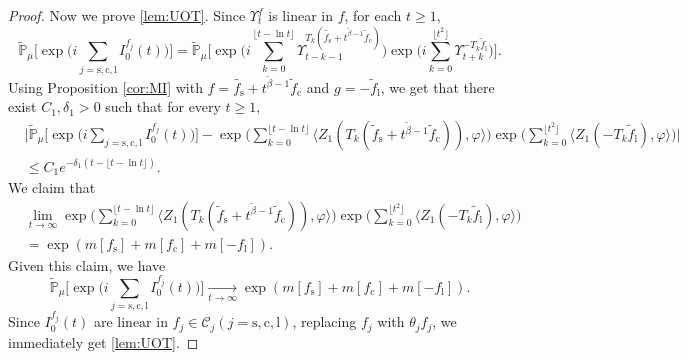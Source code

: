 \documentclass[12pt,a4paper]{amsart}
\theoremstyle{plain}
\theoremstyle{definition}
\numberwithin{equation}{section}
\begin{document}
\begin{proof}
Now we prove \eqref{lem:UOT}.
Since $\Upsilon_t^f$ is linear in $f$, for each $t\geq 1$,
\[
\widetilde{\mathbb P}_{\mu}\Big[\exp\Big(i
\sum_{j=\mathrm s,\mathrm c,\mathrm l}I_0^{f_j}(t)\Big)\Big]
= \widetilde{\mathbb P}_{\mu}\Big[\exp\Big(i\sum_{k=0}^{\lfloor t-\ln t \rfloor}\Upsilon_{t-k-1}^{T_k(\tilde{f_\mathrm s}+t^{\tilde{\beta}-1} \tilde{f}_{\mathrm c})}\Big)\exp\Big(i\sum_{k=0}^{\lfloor t^2 \rfloor}\Upsilon_{t+k}^{-T_k\tilde{f}_{\mathrm l}}\Big)\Big].
\]
Using Proposition \ref{cor:MI} 
with $f=\tilde{f_\mathrm s}+t^{\tilde{\beta}-1} \tilde{f}_{\mathrm c}$ and $g = -\tilde{f}_{\mathrm l}$, we get that there exist $C_1,\delta_1 > 0$ such that
for every $t\geq 1$,
  \begin{align}
    &\Big|\widetilde{\mathbb P}_{\mu}\Big[\exp\Big(i \sum_{j=\mathrm s,\mathrm c,\mathrm l}I_0^{f_j}(t)\Big)\Big]
    -\exp\Big(\sum_{k=0}^{\lfloor t-\ln t \rfloor} \langle Z_1(T_{k}(\tilde f_\mathrm s+t^{\tilde{\beta}-1}\tilde{f}_{\mathrm c})), \varphi\rangle \Big)\exp\Big(\sum_{k=0}^{\lfloor t^2 \rfloor}\langle Z_1(-T_k\tilde{f}_{\mathrm l}),\varphi\rangle\Big)\Big|\\
    &\leq C_1 e^{-\delta_1(t - \lfloor t - \ln t\rfloor)}.
  \end{align}
We claim that
\begin{align} \label{eq:UOT.1}
&\lim_{t\rightarrow\infty}\exp\Big(\sum_{k=0}^{\lfloor t-\ln t \rfloor} \langle Z_1(T_{k}(\tilde f_\mathrm s+t^{\tilde{\beta}-1}\tilde{f}_\mathrm c)), \varphi\rangle \Big)\exp\Big(\sum_{k=0}^{\lfloor t^2 \rfloor}\langle Z_1(-T_k\tilde{f}_\mathrm l),\varphi\rangle\Big)\\
& =\exp(m[f_\mathrm s]+m[f_\mathrm c]+m[-f_\mathrm l]).
\end{align}
Given this claim, we have
\[
	\widetilde{\mathbb P}_{\mu}\Big[\exp\Big(i
	\sum_{j=\mathrm s,\mathrm c,\mathrm l}I_0^{f_j}(t)\Big)\Big]
	 \xrightarrow[t\to \infty]{}
	 \exp(m[f_\mathrm s]+m[f_\mathrm c]+m[-f_\mathrm l]).
\]
 Since $I_0^{f_j}(t)$ are linear in 
     $f_j\in \mathcal C_j (j=\mathrm s,\mathrm c,\mathrm l)$,
 replacing $f_j$ with $\theta_j f_j$, we immediately get 
 \eqref{lem:UOT}.


\end{proof}
\end{document}
